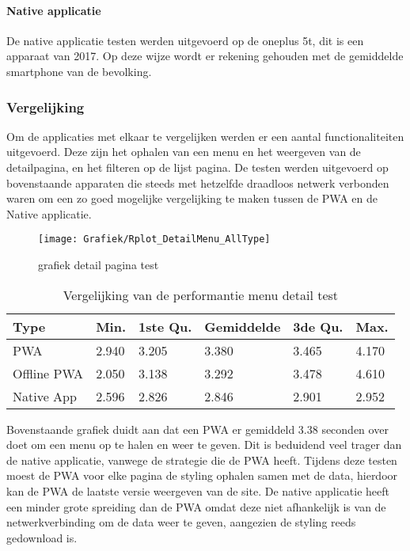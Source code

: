 \paragraph{Native applicatie}
De native applicatie testen werden uitgevoerd op de oneplus 5t, dit is een apparaat van 2017. Op deze wijze wordt er rekening gehouden met de gemiddelde smartphone van de bevolking.

\subsubsection{Vergelijking}
Om de applicaties met elkaar te vergelijken werden er een aantal functionaliteiten uitgevoerd. Deze zijn het ophalen van een menu en het weergeven van de detailpagina, en het filteren op de lijst pagina. De testen werden uitgevoerd op bovenstaande apparaten die steeds met hetzelfde draadloos netwerk verbonden waren om een zo goed mogelijke vergelijking te maken tussen de PWA en de Native applicatie.

\begin{figure}[H]
	\texttt{[image: Grafiek/Rplot\_DetailMenu\_AllType]}\centering
	\caption{grafiek detail pagina test}
\end{figure}

\begin{table}[h!]
	\centering
	\begin{tabularx}{\textwidth }{|X|X|X|X|X|X|}
		\hline
		Type        & Min.  & 1ste Qu. & Gemiddelde & 3de Qu. & Max.  \\
		\hline
		PWA         & 2.940 & 3.205    & 3.380      & 3.465   & 4.170 \\
		\hline
		Offline PWA & 2.050 & 3.138    & 3.292      & 3.478   & 4.610 \\
		\hline
		Native App  & 2.596 & 2.826    & 2.846      & 2.901   & 2.952 \\
		\hline
	\end{tabularx}
	\label{table:1}
	\caption{Vergelijking van de performantie menu detail test}
\end{table}

Bovenstaande grafiek duidt aan dat een PWA er gemiddeld 3.38 seconden over doet om een menu op te halen en weer te geven. Dit is beduidend veel trager dan de native applicatie, vanwege de strategie die de PWA heeft. Tijdens deze testen moest de PWA voor elke pagina de styling ophalen samen met de data, hierdoor kan de PWA de laatste versie weergeven van de site. De native applicatie heeft een minder grote spreiding dan de PWA omdat deze niet afhankelijk is van de netwerkverbinding om de data weer te geven, aangezien de styling reeds gedownload is.

